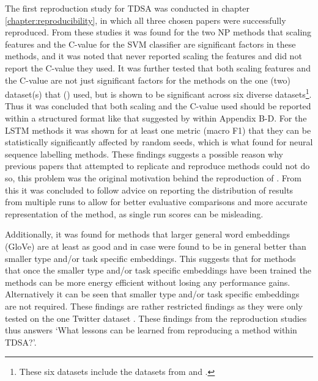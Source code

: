 The first reproduction study for TDSA was conducted in chapter \ref{chapter:reproducibility}, in which all three chosen papers were successfully reproduced. From these studies it was found for the two NP methods \citep{vo2015target, wang-etal-2017-tdparse} that scaling features and the C-value for the SVM classifier are significant factors in these methods, and it was noted that \citet{vo2015target} never reported scaling the features and \citet{wang-etal-2017-tdparse} did not report the C-value they used. It was further tested that both scaling features and the C-value are not just significant factors for the methods on the one (two) dataset(s) that \citet{vo2015target} (\citet{wang-etal-2017-tdparse}) used, but is shown to be significant across six diverse datasets\footnote{These six datasets include the datasets from \citet{vo2015target} and \citet{wang-etal-2017-tdparse}.}. Thus it was concluded that both scaling and the C-value used should be reported within a structured format like that suggested by \citet{dodge-etal-2019-show} within Appendix B-D. For the LSTM methods it was shown for at least one metric (macro F1) that they can be statistically significantly affected by random seeds, which is what \citet{reimers-gurevych-2017-reporting} found for neural sequence labelling methods. These findings suggests a possible reason why previous papers that attempted to replicate \citep{chen-etal-2017-recurrent} and reproduce \citep{tay2018learning} \citet{tang-etal-2016-effective} methods could not do so, this problem was the original motivation behind the reproduction of \citet{tang-etal-2016-effective}. From this it was concluded to follow \citet{reimers-gurevych-2017-reporting} advice on reporting the distribution of results from multiple runs to allow for better evaluative comparisons and more accurate representation of the method, as single run scores can be misleading.

Additionally, it was found for \citet{vo2015target} methods that larger general word embeddings (GloVe) are at least as good and in \citet{tang-etal-2016-effective} case were found to be in general better than smaller type and/or task specific embeddings. This suggests that for \citet{vo2015target} methods that once the smaller type and/or task specific embeddings have been trained the methods can be more energy efficient without losing any performance gains. Alternatively it can be seen that smaller type and/or task specific embeddings are not required. These findings are rather restricted findings as they were only tested on the one Twitter dataset \citep{dong-etal-2014-adaptive}. These findings from the reproduction studies thus answers  `What lessons can be learned from reproducing a method within TDSA?'.

